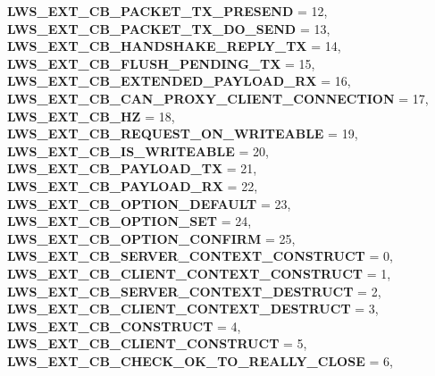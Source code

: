 \begin{DoxyCompactItemize}
\newline
{\bfseries L\+W\+S\+\_\+\+E\+X\+T\+\_\+\+C\+B\+\_\+\+P\+A\+C\+K\+E\+T\+\_\+\+T\+X\+\_\+\+P\+R\+E\+S\+E\+ND} = 12, 
{\bfseries L\+W\+S\+\_\+\+E\+X\+T\+\_\+\+C\+B\+\_\+\+P\+A\+C\+K\+E\+T\+\_\+\+T\+X\+\_\+\+D\+O\+\_\+\+S\+E\+ND} = 13, 
{\bfseries L\+W\+S\+\_\+\+E\+X\+T\+\_\+\+C\+B\+\_\+\+H\+A\+N\+D\+S\+H\+A\+K\+E\+\_\+\+R\+E\+P\+L\+Y\+\_\+\+TX} = 14, 
{\bfseries L\+W\+S\+\_\+\+E\+X\+T\+\_\+\+C\+B\+\_\+\+F\+L\+U\+S\+H\+\_\+\+P\+E\+N\+D\+I\+N\+G\+\_\+\+TX} = 15, 
\newline
{\bfseries L\+W\+S\+\_\+\+E\+X\+T\+\_\+\+C\+B\+\_\+\+E\+X\+T\+E\+N\+D\+E\+D\+\_\+\+P\+A\+Y\+L\+O\+A\+D\+\_\+\+RX} = 16, 
{\bfseries L\+W\+S\+\_\+\+E\+X\+T\+\_\+\+C\+B\+\_\+\+C\+A\+N\+\_\+\+P\+R\+O\+X\+Y\+\_\+\+C\+L\+I\+E\+N\+T\+\_\+\+C\+O\+N\+N\+E\+C\+T\+I\+ON} = 17, 
{\bfseries L\+W\+S\+\_\+\+E\+X\+T\+\_\+\+C\+B\+\_\+HZ} = 18, 
{\bfseries L\+W\+S\+\_\+\+E\+X\+T\+\_\+\+C\+B\+\_\+\+R\+E\+Q\+U\+E\+S\+T\+\_\+\+O\+N\+\_\+\+W\+R\+I\+T\+E\+A\+B\+LE} = 19, 
\newline
{\bfseries L\+W\+S\+\_\+\+E\+X\+T\+\_\+\+C\+B\+\_\+\+I\+S\+\_\+\+W\+R\+I\+T\+E\+A\+B\+LE} = 20, 
{\bfseries L\+W\+S\+\_\+\+E\+X\+T\+\_\+\+C\+B\+\_\+\+P\+A\+Y\+L\+O\+A\+D\+\_\+\+TX} = 21, 
{\bfseries L\+W\+S\+\_\+\+E\+X\+T\+\_\+\+C\+B\+\_\+\+P\+A\+Y\+L\+O\+A\+D\+\_\+\+RX} = 22, 
{\bfseries L\+W\+S\+\_\+\+E\+X\+T\+\_\+\+C\+B\+\_\+\+O\+P\+T\+I\+O\+N\+\_\+\+D\+E\+F\+A\+U\+LT} = 23, 
\newline
{\bfseries L\+W\+S\+\_\+\+E\+X\+T\+\_\+\+C\+B\+\_\+\+O\+P\+T\+I\+O\+N\+\_\+\+S\+ET} = 24, 
{\bfseries L\+W\+S\+\_\+\+E\+X\+T\+\_\+\+C\+B\+\_\+\+O\+P\+T\+I\+O\+N\+\_\+\+C\+O\+N\+F\+I\+RM} = 25, 
{\bfseries L\+W\+S\+\_\+\+E\+X\+T\+\_\+\+C\+B\+\_\+\+S\+E\+R\+V\+E\+R\+\_\+\+C\+O\+N\+T\+E\+X\+T\+\_\+\+C\+O\+N\+S\+T\+R\+U\+CT} = 0, 
{\bfseries L\+W\+S\+\_\+\+E\+X\+T\+\_\+\+C\+B\+\_\+\+C\+L\+I\+E\+N\+T\+\_\+\+C\+O\+N\+T\+E\+X\+T\+\_\+\+C\+O\+N\+S\+T\+R\+U\+CT} = 1, 
\newline
{\bfseries L\+W\+S\+\_\+\+E\+X\+T\+\_\+\+C\+B\+\_\+\+S\+E\+R\+V\+E\+R\+\_\+\+C\+O\+N\+T\+E\+X\+T\+\_\+\+D\+E\+S\+T\+R\+U\+CT} = 2, 
{\bfseries L\+W\+S\+\_\+\+E\+X\+T\+\_\+\+C\+B\+\_\+\+C\+L\+I\+E\+N\+T\+\_\+\+C\+O\+N\+T\+E\+X\+T\+\_\+\+D\+E\+S\+T\+R\+U\+CT} = 3, 
{\bfseries L\+W\+S\+\_\+\+E\+X\+T\+\_\+\+C\+B\+\_\+\+C\+O\+N\+S\+T\+R\+U\+CT} = 4, 
{\bfseries L\+W\+S\+\_\+\+E\+X\+T\+\_\+\+C\+B\+\_\+\+C\+L\+I\+E\+N\+T\+\_\+\+C\+O\+N\+S\+T\+R\+U\+CT} = 5, 
\newline
{\bfseries L\+W\+S\+\_\+\+E\+X\+T\+\_\+\+C\+B\+\_\+\+C\+H\+E\+C\+K\+\_\+\+O\+K\+\_\+\+T\+O\+\_\+\+R\+E\+A\+L\+L\+Y\+\_\+\+C\+L\+O\+SE} = 6, 

\end{DoxyCompactItemize}

